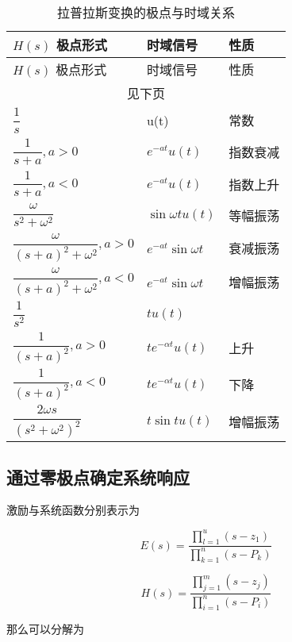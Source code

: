 \documentclass[cn,11pt,chinese,black,simple]{../elegantbook}
\begin{document}
\begin{longtable}{lll} 
    \caption{拉普拉斯变换的极点与时域关系} \\ 
    \toprule
    \(H(s)\) 极点形式 & 时域信号 & 性质\\ 
    \midrule
    \endfirsthead
    
    \toprule
    \(H(s)\) 极点形式 & 时域信号 & 性质\\ 
    \midrule
    \endhead 
  
    \hline
    \multicolumn{3}{c}{见下页}\\   \bottomrule
    \endfoot
  
    \bottomrule
    \endlastfoot
    
    \(\dfrac{1}{s}\) & u(t) & 常数 \\
    \(\dfrac{1}{s + a}, a > 0\)  & \(e^{-a t} u(t)\) & 指数衰减 \\
    \(\dfrac{1}{s + a}, a < 0\)  & \(e^{-a t} u(t)\) & 指数上升 \\
    \(\dfrac{\omega}{s^2 + \omega^2}\) & \(\sin \omega t u(t)\) & 等幅振荡 \\
    \(\dfrac{\omega}{(s + a)^2 + \omega^2}, a > 0\) & \(e^{-a t} \sin \omega t\) & 衰减振荡 \\
    \(\dfrac{\omega}{(s + a)^2 + \omega^2}, a < 0\) & \(e^{-a t} \sin \omega t\) & 增幅振荡 \\

    \(\dfrac{1}{s^2}\) & \(t u(t)\) & \\
    \(\dfrac{1}{(s+a)^2}, a > 0\) &  \(t e^{-\alpha t} u(t)\) & 上升 \\
    \(\dfrac{1}{(s+a)^2}, a < 0\) &  \(t e^{-\alpha t} u(t)\) & 下降 \\
    \(\dfrac{2\omega s}{(s^2 + \omega^2)^2}\) & \(t \sin t u(t)\) & 增幅振荡 \\


\end{longtable}

\subsection{通过零极点确定系统响应}

激励与系统函数分别表示为

\[E(s)=\dfrac{\prod_{l=1}^{u}\left(s-z_{1}\right)}{\prod_{k=1}^{n}\left(s-P_{k}\right)} \]

\[H(s)=\dfrac{\prod_{j=1}^{m}\left(s-z_{j}\right)}{\prod_{i=1}^{n}\left(s-P_{i}\right)}\]

那么可以分解为
\end{document}
